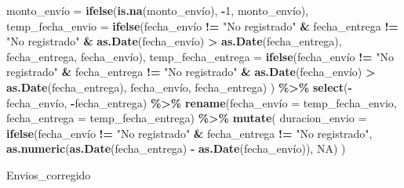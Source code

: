 \documentclass[
]{article}
\newenvironment{Shaded}{\begin{snugshade}}{\end{snugshade}}
\newcommand{\AttributeTok}[1]{\textcolor[rgb]{0.13,0.29,0.53}{#1}}
\newcommand{\ConstantTok}[1]{\textcolor[rgb]{0.56,0.35,0.01}{#1}}
\newcommand{\DecValTok}[1]{\textcolor[rgb]{0.00,0.00,0.81}{#1}}
\newcommand{\FunctionTok}[1]{\textcolor[rgb]{0.13,0.29,0.53}{\textbf{#1}}}
\newcommand{\NormalTok}[1]{#1}
\newcommand{\OtherTok}[1]{\textcolor[rgb]{0.56,0.35,0.01}{#1}}
\newcommand{\SpecialCharTok}[1]{\textcolor[rgb]{0.81,0.36,0.00}{\textbf{#1}}}
\newcommand{\StringTok}[1]{\textcolor[rgb]{0.31,0.60,0.02}{#1}}
\begin{document}
\begin{Shaded}
\begin{Highlighting}[]
\NormalTok{    monto\_envío }\OtherTok{=} \FunctionTok{ifelse}\NormalTok{(}\FunctionTok{is.na}\NormalTok{(monto\_envío), }\SpecialCharTok{{-}}\DecValTok{1}\NormalTok{, monto\_envío),}
    \AttributeTok{temp\_fecha\_envio =} \FunctionTok{ifelse}\NormalTok{(fecha\_envío }\SpecialCharTok{!=} \StringTok{"No registrado"} \SpecialCharTok{\&}\NormalTok{ fecha\_entrega }\SpecialCharTok{!=} \StringTok{"No registrado"} \SpecialCharTok{\&} \FunctionTok{as.Date}\NormalTok{(fecha\_envío) }\SpecialCharTok{\textgreater{}} \FunctionTok{as.Date}\NormalTok{(fecha\_entrega), fecha\_entrega, fecha\_envío),}
    \AttributeTok{temp\_fecha\_entrega =} \FunctionTok{ifelse}\NormalTok{(fecha\_envío }\SpecialCharTok{!=} \StringTok{"No registrado"} \SpecialCharTok{\&}\NormalTok{ fecha\_entrega }\SpecialCharTok{!=} \StringTok{"No registrado"} \SpecialCharTok{\&} \FunctionTok{as.Date}\NormalTok{(fecha\_envío) }\SpecialCharTok{\textgreater{}} \FunctionTok{as.Date}\NormalTok{(fecha\_entrega), fecha\_envío, fecha\_entrega)}
\NormalTok{  ) }\SpecialCharTok{\%\textgreater{}\%}
  \FunctionTok{select}\NormalTok{(}\SpecialCharTok{{-}}\NormalTok{fecha\_envío, }\SpecialCharTok{{-}}\NormalTok{fecha\_entrega) }\SpecialCharTok{\%\textgreater{}\%}
  \FunctionTok{rename}\NormalTok{(fecha\_envío }\OtherTok{=}\NormalTok{ temp\_fecha\_envio, }\AttributeTok{fecha\_entrega =}\NormalTok{ temp\_fecha\_entrega) }\SpecialCharTok{\%\textgreater{}\%}
  \FunctionTok{mutate}\NormalTok{(}
    \AttributeTok{duracion\_envio =} \FunctionTok{ifelse}\NormalTok{(fecha\_envío }\SpecialCharTok{!=} \StringTok{"No registrado"} \SpecialCharTok{\&}\NormalTok{ fecha\_entrega }\SpecialCharTok{!=} \StringTok{"No registrado"}\NormalTok{,}
                            \FunctionTok{as.numeric}\NormalTok{(}\FunctionTok{as.Date}\NormalTok{(fecha\_entrega) }\SpecialCharTok{{-}} \FunctionTok{as.Date}\NormalTok{(fecha\_envío)),}
                            \ConstantTok{NA}\NormalTok{)}
\NormalTok{  )}

\NormalTok{Envios\_corregido}
\end{Highlighting}
\end{Shaded}
\end{document}
